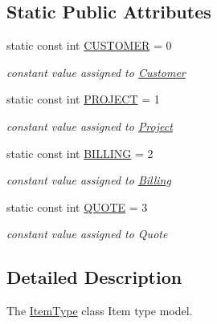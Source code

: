 \subsection*{Static Public Attributes}
\begin{DoxyCompactItemize}
\item 
\hypertarget{classItemType_acb95d26d14359ec380296ca1d5a5cbdc}{static const int \hyperlink{classItemType_acb95d26d14359ec380296ca1d5a5cbdc}{C\+U\+S\+T\+O\+M\+E\+R} = 0}\label{classItemType_acb95d26d14359ec380296ca1d5a5cbdc}

\begin{DoxyCompactList}\small\item\em constant value assigned to \hyperlink{classCustomer}{Customer} \end{DoxyCompactList}\item 
\hypertarget{classItemType_ad7a156ecb9641e198ddc95a7e648fb8b}{static const int \hyperlink{classItemType_ad7a156ecb9641e198ddc95a7e648fb8b}{P\+R\+O\+J\+E\+C\+T} = 1}\label{classItemType_ad7a156ecb9641e198ddc95a7e648fb8b}

\begin{DoxyCompactList}\small\item\em constant value assigned to \hyperlink{classProject}{Project} \end{DoxyCompactList}\item 
\hypertarget{classItemType_a4b72d61f3cdd0b89e59c51b3545c9312}{static const int \hyperlink{classItemType_a4b72d61f3cdd0b89e59c51b3545c9312}{B\+I\+L\+L\+I\+N\+G} = 2}\label{classItemType_a4b72d61f3cdd0b89e59c51b3545c9312}

\begin{DoxyCompactList}\small\item\em constant value assigned to \hyperlink{classBilling}{Billing} \end{DoxyCompactList}\item 
\hypertarget{classItemType_af058fe8d8650049f04ad37bbcbb058b8}{static const int \hyperlink{classItemType_af058fe8d8650049f04ad37bbcbb058b8}{Q\+U\+O\+T\+E} = 3}\label{classItemType_af058fe8d8650049f04ad37bbcbb058b8}

\begin{DoxyCompactList}\small\item\em constant value assigned to Quote \end{DoxyCompactList}\end{DoxyCompactItemize}


\subsection{Detailed Description}
The \hyperlink{classItemType}{Item\+Type} class Item type model. 

